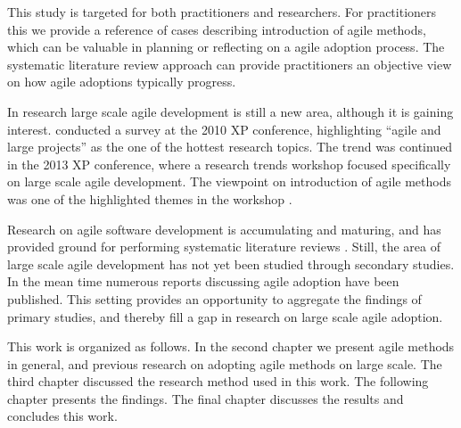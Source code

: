 This study is targeted for both practitioners and researchers. For practitioners
this we provide a reference of cases describing introduction of agile methods,
which can be valuable in planning or reflecting on a agile adoption process. The
systematic literature review approach can provide practitioners an objective
view on how agile adoptions typically progress.

In research large scale agile development is still a new area, although
it is gaining interest.
\citet{Freudenberg2010} conducted a survey at the 2010 XP conference,
highlighting ``agile and large projects'' as the one of the hottest research
topics. The trend was continued in the 2013 XP conference, where a research
trends workshop focused specifically on large scale agile development. The
viewpoint on introduction of agile methods was one of the highlighted themes in
the workshop \citep{Dingsoyr2013a}.

Research on agile software development is accumulating and maturing, and has
provided ground for performing systematic literature reviews
\citep{Dyba2008,Jalali2012,Senapathi2013,Kaisti2013}. Still, the area of large
scale agile development has not yet been studied through secondary studies. In
the mean time numerous reports discussing agile adoption have been published.
This setting provides an opportunity to aggregate the findings of primary
studies, and thereby fill a gap in research on large scale agile adoption.

This work is organized as follows. In the second chapter we present agile
methods in general, and previous research on adopting agile methods on large
scale. The third chapter discussed the research method used in this work.
The following chapter presents the findings. The final chapter discusses the
results and concludes this work.




